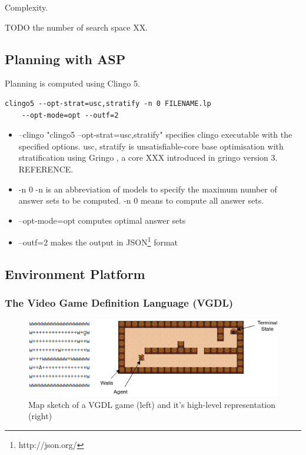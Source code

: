 Complexity. 

TODO the number of search space XX. 

\subsection{Planning with ASP}
Planning is computed using Clingo 5.

\begin{lstlisting}[]
    clingo5 --opt-strat=usc,stratify -n 0 FILENAME.lp
    --opt-mode=opt --outf=2
\end{lstlisting}

\begin{itemize}
\item \textsf{--clingo "clingo5 --opt-strat=usc,stratify"} specifies clingo executable with the specified options. 
\textsf{usc, stratify} is unsatisfiable-core base optimisation with stratification using Gringo \cite{gringo}, a core XXX introduced in gringo version 3. REFERENCE.
\item \textsf{-n 0} -n is an abbreviation of \textsf{models} to specify the maximum number of answer sets to be computed. \textsf{-n 0} means to compute all answer sets.
\item \textsf{--opt-mode=opt} computes optimal answer sets
\item \textsf{--outf=2} makes the output in JSON\footnote{http://json.org/} format
\end{itemize}

\subsection{Environment Platform}
\subsubsection{The Video Game Definition Language (VGDL)}

\begin{figure}[!ht!b]
\centering
\includegraphics[width=1\textwidth]{./figures/env_sample}
\caption{Map sketch of a VGDL game (left) and it's high-level representation (right)} 
\label{VGDL_sample}
\end{figure}

